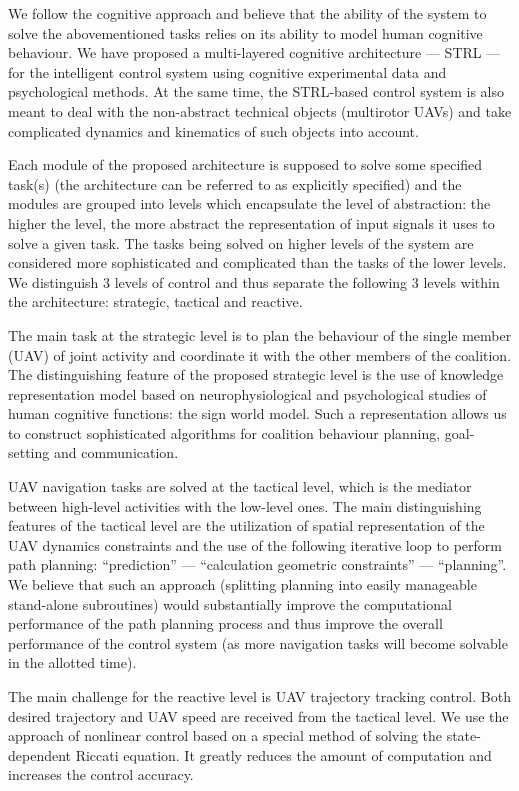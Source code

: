 \documentclass[review]{elsarticle}
\begin{document}
We follow the cognitive approach and believe that the ability of the system to solve the abovementioned tasks relies on its ability to model human cognitive behaviour. We have proposed a multi-layered cognitive architecture --- STRL --- for the intelligent control system using cognitive experimental data and psychological methods. At the same time, the STRL-based control system is also meant to deal with the non-abstract technical objects (multirotor UAVs) and take complicated dynamics and kinematics of such objects into account.

Each module of the proposed architecture is supposed to solve some specified task(s) (the architecture can be referred to as explicitly specified) and the modules are grouped into levels which encapsulate the level of abstraction: the higher the level, the more abstract the representation of input signals it uses to solve a given task. The tasks being solved on higher levels of the system are considered more sophisticated and complicated than the tasks of the lower levels. We distinguish 3 levels of control and thus separate the following 3 levels within the architecture: strategic, tactical and reactive. 

The main task at the strategic level is to plan the behaviour of the single member (UAV) of joint activity and coordinate it with the other members of the coalition. The distinguishing feature of the proposed strategic level is the use of knowledge representation model based on neurophysiological and psychological studies of human cognitive functions: the sign world model. Such a representation allows us to construct sophisticated algorithms for coalition behaviour planning, goal-setting and communication. 

UAV navigation tasks are solved at the tactical level, which is the mediator between high-level activities with the low-level ones. The main distinguishing features of the tactical level are the utilization of spatial representation of the UAV dynamics constraints and the use of the following iterative loop to perform path planning: ``prediction'' --- ``calculation geometric constraints'' --- ``planning''.  We believe that such an approach (splitting planning into easily manageable stand-alone subroutines) would substantially improve the computational performance of the path planning process and thus improve the overall performance of the control system (as more navigation tasks will become solvable in the allotted time). 

The main challenge for the reactive level is UAV trajectory tracking control. Both desired trajectory and UAV speed are received from the tactical level. We use the approach of nonlinear control based on a special method of solving the state-dependent Riccati equation. It greatly reduces the amount of computation and increases the control accuracy.
\end{document}
